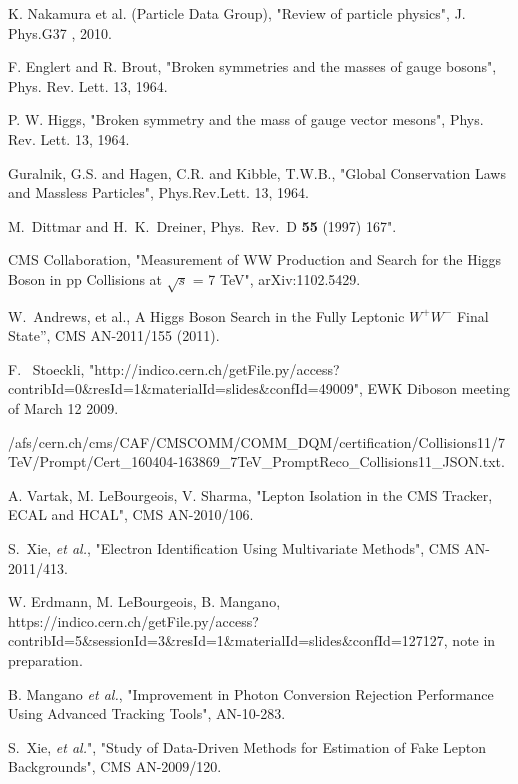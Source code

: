 \clearpage

\vspace*{-0.2cm}

 K. Nakamura et al. (Particle Data Group), "Review of particle physics", J. Phys.G37 , 2010.

F. Englert and R. Brout, "Broken symmetries and the masses of gauge bosons", Phys. Rev. Lett. 13,  1964.

P. W. Higgs, "Broken symmetry and the mass of gauge vector mesons", Phys. Rev. Lett. 13, 1964.

Guralnik, G.S. and Hagen, C.R. and Kibble, T.W.B., "Global Conservation Laws and Massless Particles", 
Phys.Rev.Lett. 13, 1964.

M.~Dittmar and H.~K.~Dreiner, Phys.\ Rev.\  D {\bf 55} (1997) 167".

CMS Collaboration, "Measurement of WW Production and Search for the Higgs Boson in 
pp Collisions at $\sqrt{s}$ = 7 TeV", arXiv:1102.5429.

W.~Andrews, et al., A Higgs Boson Search in the Fully Leptonic $W^+W^-$ Final State”, CMS AN-2011/155 (2011).

F.~ Stoeckli, "http://indico.cern.ch/getFile.py/access?contribId=0\&resId=1\&materialId=slides\&confId=49009", 
EWK Diboson meeting of March 12 2009.

{\small
/afs/cern.ch/cms/CAF/CMSCOMM/COMM\_DQM/certification/Collisions11/7TeV/Prompt/Cert\_160404-163869\_7TeV\_PromptReco\_Collisions11\_JSON.txt.
}

A. Vartak, M. LeBourgeois, V. Sharma, "Lepton Isolation in the CMS Tracker, ECAL and HCAL", CMS AN-2010/106.

S.~Xie, \textit{et al.}, "Electron Identification Using Multivariate Methods", 
CMS AN-2011/413.

W. Erdmann, M. LeBourgeois, B. Mangano, 
https://indico.cern.ch/getFile.py/access?contribId=5\&sessionId=3\&resId=1\&materialId=slides\&confId=127127, 
note in preparation.

B. Mangano \textit{et al.}, "Improvement in Photon Conversion Rejection Performance Using 
Advanced Tracking Tools", AN-10-283.

S.~Xie, \textit{et al.}", "Study of Data-Driven Methods for Estimation of Fake Lepton Backgrounds", 
CMS AN-2009/120.

